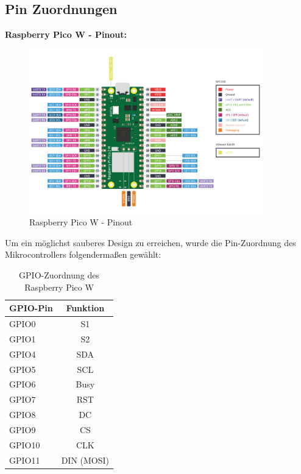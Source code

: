 \begin{inhalt}
\section{Pin Zuordnungen} \label{sec:Pin_Zuordnungen}

\textbf{Raspberry Pico W - Pinout:}

\begin{figure}[!htb]
\centering
\includegraphics[width=0.90\textwidth]{files/Tobias/pics/Pinout/pico2w-pinout.pdf}
\caption[Raspberry Pico W - Pinout]{Raspberry Pico W - Pinout \cite{PicoW Pinout}}
\label{fig:PicoW_Pinout}
\end{figure}




Um ein möglichst sauberes Design zu erreichen, wurde die Pin-Zuordnung des Mikrocontrollers folgendermaßen gewählt:

\renewcommand{\arraystretch}{1}

\begin{table}[H]
\centering
{}
\begin{tabular}{|l|c|}
\hline
\rowcolor{cyan!20}
\textbf{GPIO-Pin} & \textbf{Funktion} \\
\hline
GPIO0 & S1 \\
\hline
GPIO1 & S2 \\
\hline
GPIO4 & SDA \\
\hline
GPIO5 & SCL \\
\hline
GPIO6 & Busy \\
\hline
GPIO7 & RST \\
\hline
GPIO8 & DC \\
\hline
GPIO9 & CS \\
\hline
GPIO10 & CLK \\
\hline
GPIO11 & DIN (MOSI) \\
\hline
\end{tabular}
\caption{GPIO-Zuordnung des Raspberry Pico W}
\label{tab:GPIO_Zuordnung}
\end{table}



\end{inhalt}
